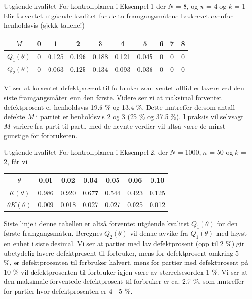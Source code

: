 \begin{eksempel}{Utgående kvalitet}
For kontrollplanen i Eksempel 1 der $N$ = 8, og $n$ = 4 og $k$ = 1 blir
forventet utgående kvalitet for de to framgangsmåtene beskrevet 
ovenfor henholdsvis (sjekk tallene!)
\begin{center}
\begin{tabular}{|c|ccccccccc|} \hline
$M$ &   0   &   1   &   2   &   3   &   4   &   5   &  6   &  7  &  8\\ \hline
$Q_1(\theta )$& 0 & 0.125 & 0.196 & 0.188 & 0.121 & 0.045 &  0  &  0  &  0 \\
$Q_2(\theta )$& 0 & 0.063 & 0.125 & 0.134 & 0.093 & 0.036 & 0 & 0 & 0\\ \hline
\end{tabular}
\end{center}
Vi ser at forventet defektprosent til forbruker som ventet alltid er
lavere ved den siste framgangsmåten enn den første.  Videre ser vi
at maksimal forventet defektprosent er henholdsvis 19.6 \% og 13.4 \%.
Dette inntreffer dersom antall defekte $M$ i partiet er henholdsvis 
2 og 3 (25 \% og 37.5 \%).  I praksis vil selvsagt $M$ variere fra parti
til parti, med de nevnte verdier vil altså være de minst gunstige
for forbrukeren.
\end{eksempel}


\begin{eksempel}{Utgående kvalitet}
For kontrollplanen i Eksempel 2, der $N$ = 1000, $n$ = 50 og $k$ = 2,
 får vi 
\begin{center}
\begin{tabular}{|c|cccccc|} \hline
$\theta$     &   0.01  &  0.02  &  0.04  &  0.05  &  0.06  &  0.10  \\ \hline
$K(\theta )$        & 0.986 & 0.920 & 0.677 & 0.544 & 0.423 & 0.125 \\
$\theta K(\theta )$& 0.009 & 0.018 & 0.027 & 0.027 & 0.025 & 0.012 \\ \hline
\end{tabular}
\end{center}
Siste linje i denne tabellen er altså forventet utgående kvalitet
$Q_1(\theta)$ for den første framgangsmåten.  Beregnes 
$Q_2(\theta)$ vil denne avvike fra $Q_1(\theta)$ med høyst en enhet
i siste desimal.  Vi ser at partier med lav defektprosent (opp til 2 \%)
gir ubetydelig lavere defektprosent til forbruker, mens for defektprosent 
omkring 5 \%, er defektprosenten til forbruker halvert, mens for partier
med defektprosent på 10 \% vil defektprosenten til forbruker igjen
være av størrelsesorden 1 \%.  Vi ser at den maksimale forventede
defektprosent til forbruker er ca. 2.7 \%, som inntreffer for partier
hvor defektprosenten er 4 - 5 \%.
\end{eksempel}

